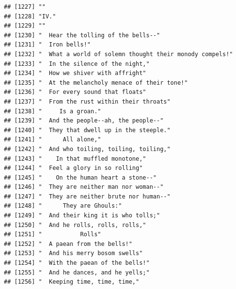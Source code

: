 \documentclass{article}\usepackage[]{graphicx}\usepackage[]{color}
\makeatletter
\newenvironment{kframe}{%
 \def\at@end@of@kframe{}%
 \ifinner\ifhmode%
  \def\at@end@of@kframe{\end{minipage}}%
  \begin{minipage}{\columnwidth}%
 \fi\fi%
 \def\FrameCommand##1{\hskip\@totalleftmargin \hskip-\fboxsep
 \colorbox{shadecolor}{##1}\hskip-\fboxsep
     \hskip-\linewidth \hskip-\@totalleftmargin \hskip\columnwidth}%
 \MakeFramed {\advance\hsize-\width
   \@totalleftmargin\z@ \linewidth\hsize
   \@setminipage}}%
 {\par\unskip\endMakeFramed%
 \at@end@of@kframe}
\newenvironment{knitrout}{}{} %
\makeatother
\begin{document}
\begin{knitrout}
\begin{kframe}
\begin{verbatim}
## [1227] ""                                                                            
## [1228] "IV."                                                                         
## [1229] ""                                                                            
## [1230] "  Hear the tolling of the bells--"                                           
## [1231] "  Iron bells!"                                                               
## [1232] "  What a world of solemn thought their monody compels!"                      
## [1233] "  In the silence of the night,"                                              
## [1234] "  How we shiver with affright"                                               
## [1235] "  At the melancholy menace of their tone!"                                   
## [1236] "  For every sound that floats"                                               
## [1237] "  From the rust within their throats"                                        
## [1238] "     Is a groan."                                                            
## [1239] "  And the people--ah, the people--"                                          
## [1240] "  They that dwell up in the steeple."                                        
## [1241] "      All alone,"                                                            
## [1242] "  And who toiling, toiling, toiling,"                                        
## [1243] "    In that muffled monotone,"                                               
## [1244] "  Feel a glory in so rolling"                                                
## [1245] "    On the human heart a stone--"                                            
## [1246] "  They are neither man nor woman--"                                          
## [1247] "  They are neither brute nor human--"                                        
## [1248] "      They are Ghouls:"                                                      
## [1249] "  And their king it is who tolls;"                                           
## [1250] "  And he rolls, rolls, rolls,"                                               
## [1251] "           Rolls"                                                            
## [1252] "  A paean from the bells!"                                                   
## [1253] "  And his merry bosom swells"                                                
## [1254] "  With the paean of the bells!"                                              
## [1255] "  And he dances, and he yells;"                                              
## [1256] "  Keeping time, time, time,"                                                 

\end{verbatim}
\end{kframe}
\end{knitrout}
\end{document}
